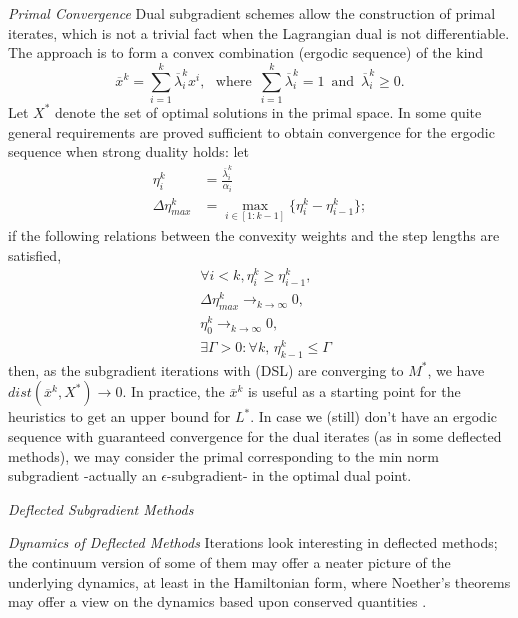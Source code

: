 \documentclass[10pt,twoside,book,a5paper]{ncc}
\begin{document}
\emph{Primal Convergence}
Dual subgradient schemes allow the construction of primal iterates, which is not a trivial fact when the Lagrangian dual is not differentiable. The approach is to form a convex combination (ergodic sequence) of the kind
\[
\overline{x}^k = \sum_{i=1}^{k} \overline{\lambda}_i^k x^i, \,\,\,\, \textrm{where} \,\,\, \sum_{i=1}^k \overline{\lambda}_i^k = 1 \,\,\, \textrm{and} \,\,\, \overline{\lambda}_i^k \ge 0.
\]
Let $X^*$ denote the set of optimal solutions in the primal space. In \cite{Primal} some quite general requirements are proved sufficient to obtain convergence for the ergodic sequence when strong duality holds: let
\begin{align}
    \eta_i^k & = \frac{\overline{\lambda}_i^k}{\alpha_i} \\
    \Delta\eta_{max}^k & = \max_{i\in[1:k-1]} \{\eta_i^k-\eta_{i-1}^k\};
\end{align}
if the following relations between the convexity weights and the step lengths are satisfied,
\begin{align}
    &\forall i<k, \eta_i^k \ge \eta_{i-1}^k, \\
    &\Delta\eta_{max}^k \to_{k\to\infty} 0, \\
    &\eta_0^k \to_{k\to\infty} 0, \\
    &\exists \Gamma>0 : \forall k,\,\eta_{k-1}^k \le \Gamma
\end{align}
then, as the subgradient iterations with (DSL) are converging to $M^*$, we have $dist(\overline{x}^k, X^*) \to 0$. In practice, the $\overline{x}^k$ is useful as a starting point for the heuristics to get an upper bound for $L^*$. In case we (still) don't have an ergodic sequence with guaranteed convergence for the dual iterates (as in some deflected methods), we may consider the primal corresponding to the min norm subgradient -actually an $\epsilon$-subgradient- in the optimal dual point.

\emph{Deflected Subgradient Methods}

\emph{Dynamics of Deflected Methods} Iterations look interesting in deflected methods; the continuum version of some of them may offer a neater picture of the underlying dynamics, at least in the Hamiltonian form, where Noether's theorems may offer a view on the dynamics based upon conserved quantities \cite{JordanMomentum}.
\end{document}
